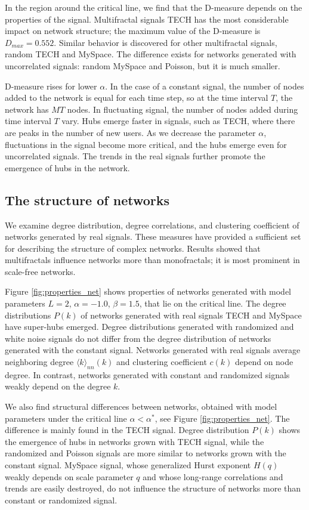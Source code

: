 In the region around the critical line, we find that the D-measure depends on the properties of the signal. Multifractal signals TECH has the most considerable impact on network structure; the maximum value of the D-measure is $D_{max}=0.552$. Similar behavior is discovered for other multifractal signals, random TECH and MySpace. The difference exists for networks generated with uncorrelated signals: random MySpace and Poisson, but it is much smaller.

D-measure rises for lower $\alpha$. In the case of a constant signal, the number of nodes added to the network is equal for each time step, so at the time interval $T$, the network has $MT$ nodes. In fluctuating signal, the number of nodes added during time interval $T$ vary. Hubs emerge faster in signals, such as TECH, where there are peaks in the number of new users. As we decrease the parameter $\alpha$, fluctuations in the signal become more critical, and the hubs emerge even for uncorrelated signals. The trends in the real signals further promote the emergence of hubs in the network.  

\subsection{The structure of networks}

We examine degree distribution, degree correlations, and clustering coefficient of networks generated by real signals. These measures have provided a sufficient set for describing the structure of complex networks. Results showed that multifractals influence networks more than monofractals; it is most prominent in scale-free networks. 

Figure \ref{fig:properties_net} shows properties of networks generated with model parameters $L=2$, $\alpha=-1.0$, $\beta=1.5$, that lie on the critical line. The degree distributions $P(k)$ of networks generated with real signals TECH and MySpace have super-hubs emerged. Degree distributions generated with randomized and white noise signals do not differ from the degree distribution of networks generated with the constant signal. Networks generated with real signals average neighboring degree $\langle k\rangle_{nn}(k)$ and clustering coefficient $c(k)$ depend on node degree. In contrast, networks generated with constant and randomized signals weakly depend on the degree $k$.

We also find structural differences between networks, obtained with model parameters under the critical line $\alpha<\alpha^{*}$, see Figure \ref{fig:properties_net}. The difference is mainly found in the TECH signal. Degree distribution $P(k)$ shows the emergence of hubs in networks grown with TECH signal, while the randomized and Poisson signals are more similar to networks grown with the constant signal. MySpace signal, whose generalized Hurst exponent $H(q)$ weakly depends on scale parameter $q$ and whose long-range correlations and trends are easily destroyed, do not influence the structure of networks more than constant or randomized signal.   

